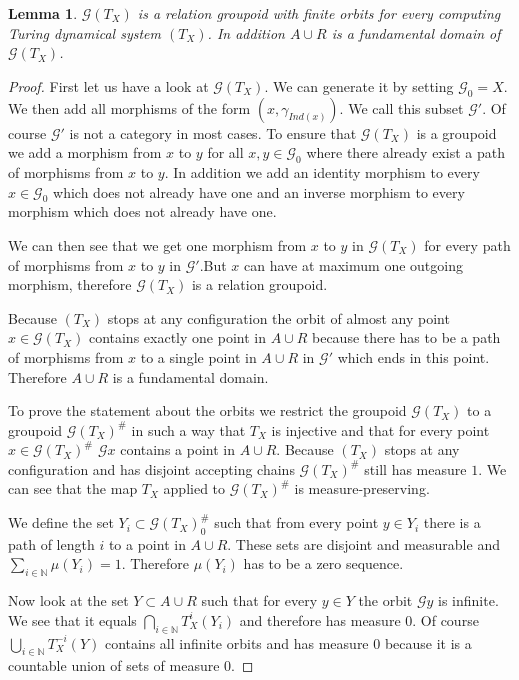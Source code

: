 \documentclass[12pt,a4paper]{scrartcl}
\newtheorem{Lemma}[Theorem]{Lemma}
\numberwithin{equation}{section}
\newcommand{\N}{\mathbb{N}} %
\newcommand{\2}{\mathbb{Z} / 2 \mathbb{Z}}
\newcommand{\G}{\mathcal{G}}
\newcommand{\1}{\bar{1}}
\newcommand{\0}{\bar{0}}
\begin{document}
\begin{Lemma} \label{TX_rel_groupoid}
	$\G (T_X)$ is a relation groupoid with finite orbits for every computing Turing dynamical system $(T_X)$. In addition $A \cup R$ is a fundamental domain of $\G (T_X)$.
\end{Lemma}
\begin{proof}
	First let us have a look at $\G (T_X)$. We can generate it by setting $\G_0 = X$. We then add all morphisms of the form $(x, \gamma_{Ind(x)})$. We call this subset $\G'$. Of course $\G'$ is not a category in most cases. To ensure that $\G (T_X)$ is a groupoid we add a morphism from $x$ to $y$ for all $x, y \in \G_0$ where there already exist a path of morphisms from $x$ to $y$. In addition we add an identity morphism to every $ x\in \G_0$ which does not already have one and an inverse morphism to every morphism which does not already have one. 
	
	We can then see that we get one morphism from $x$ to $y$ in $\G (T_X)$ for every path of morphisms from $x$ to $y$ in $\G'$.But $x$ can have at maximum one outgoing morphism, therefore $\G (T_X)$ is a relation groupoid.

	Because $(T_X)$ stops at any configuration the orbit of almost any point $x \in \G (T_X)$ contains exactly one point in $A \cup R$ because there has to be a path of morphisms from $x$ to a single point in $A \cup R$ in $\G'$ which ends in this point. Therefore $A \cup R$ is a fundamental domain.
	
	To prove the statement about the orbits we restrict the groupoid $\G (T_X)$ to a groupoid $\G (T_X)^\#$ in such a way that $T_X$ is injective and that for every point $x \in \G (T_X)^\#$ $\G x$ contains a point in $A \cup R$. Because $(T_X)$ stops at any configuration and has disjoint accepting chains $\G (T_X)^\#$ still has measure $1$. We can see that the map $T_X$ applied to $\G (T_X)^\#$ is measure-preserving.
	
	We define the set $Y_i \subset \G (T_X)_0^\#$ such that from every point $y \in Y_i$ there is a path of length $i$ to a point in $A \cup R$. These sets are disjoint and measurable and $\sum_{i \in \N} \mu(Y_i) = 1$. Therefore $\mu(Y_i)$ has to be a zero sequence.
	
	Now look at the set $Y \subset A \cup R$ such that for every $y \in Y$ the orbit $\G y$ is infinite. We see that it equals $\bigcap_{i \in \N} T_X^i(Y_i)$ and therefore has measure $0$. Of course $\bigcup_{i \in \N }T_X^{-i}(Y)$ contains all infinite orbits and has measure $0$ because it is a countable union of sets of measure $0$.
\end{proof}
\end{document}
